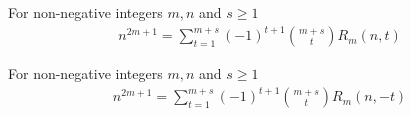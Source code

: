 \begin{proposition}
    For non-negative integers $m,n$ and $s\geq 1$
    \begin{align*}
        n^{2m+1} = \sum_{t=1}^{m+s} (-1)^{t+1} \binom{m+s}{t} R_{m} (n, t)
    \end{align*}
\end{proposition}
\begin{proposition}
    For non-negative integers $m,n$ and $s \geq 1$
    \begin{align*}
        n^{2m+1} = \sum_{t=1}^{m+s} (-1)^{t+1} \binom{m+s}{t} R_{m} (n, -t)
    \end{align*}
\end{proposition}
